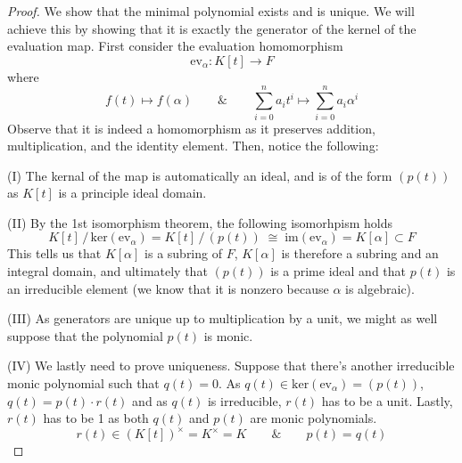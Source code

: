 \vspace{2ex}
\begin{proof}
We show that the minimal polynomial exists and is unique. We will achieve this by showing that it is exactly the generator of the kernel of the evaluation map. First consider the evaluation homomorphism
\[\mathrm{ev}_{\alpha }:K[t]\rightarrow F\]
where
\[f(t)\mapsto f(\alpha )\qquad\&\qquad \sum ^{n}_{i=0}a_{i}t^{i}\mapsto \sum ^{n}_{i=0}a_{i}\alpha ^{i}\]
Observe that it is indeed a homomorphism as it preserves addition, multiplication, and the identity element. Then, notice the following:

\bigskip

(I) The kernal of the map is automatically an ideal, and is of the form $(p(t))$ as $K[t]$ is a principle ideal domain.

\bigskip

(II) By the 1st isomorphism theorem, the following isomorhpism holds
\[K[t]\,/\,\mathrm{ker}(\mathrm{ev}_{\alpha })=K[t]\,/\,(p(t))\;\cong\; \mathrm{im}(\mathrm{ev}_{\alpha })=K[\alpha ]\subset F\]
This tells us that $K[\alpha ]$ is a subring of $F$, $K[\alpha ]$ is therefore a subring and an integral domain, and ultimately that $(p(t))$ is a prime ideal and that $p(t)$ is an irreducible element (we know that it is nonzero because $\alpha $ is algebraic).

\bigskip

(III) As generators are unique up to multiplication by a unit, we might as well suppose that the polynomial $p(t)$ is monic.

\bigskip

(IV) We lastly need to prove uniqueness. Suppose that there's another irreducible monic polynomial such that $q(t)=0$. As $q(t)\in \mathrm{ker}(\mathrm{ev}_{\alpha })=(p(t))$, $q(t)=p(t)\cdot r(t)$ and as $q(t)$ is irreducible, $r(t)$ has to be a unit. Lastly, $r(t)$ has to be 1 as both $q(t)$ and $p(t)$ are monic polynomials. 
\[r(t)\in (K[t])^{\times }=K^{\times }=K\qquad\&\qquad p(t)=q(t)\]

\end{proof}
\vspace{2ex}

